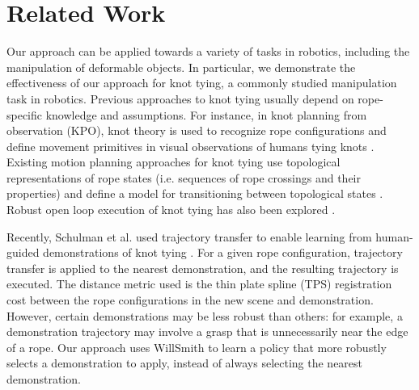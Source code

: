 \section{Related Work}

Our approach can be applied towards a variety of tasks in robotics,
including the manipulation of deformable objects.
In particular, we demonstrate the effectiveness of our approach for
knot tying, a commonly studied manipulation task in robotics.
Previous approaches to knot tying usually depend on rope-specific knowledge
and assumptions.
For instance, in knot planning from observation (KPO), knot theory is used
to recognize rope configurations and define movement primitives in visual
observations of humans tying knots \cite{Morita_ICRA2003, Takamatsu_TransRob2006}.
Existing motion planning approaches for knot tying use topological
representations of rope states (i.e. sequences of rope crossings and their
properties) and define a model for transitioning between topological states
\cite{Saha_ExpRobotics2008, Wakamatsu_IJRR2006}.
Robust open loop execution of knot tying has also been explored \cite{Bell_PhD2010}.

Recently, Schulman et al. used trajectory transfer to enable learning
from human-guided demonstrations of knot tying \cite{Schulmanetal_ISRR2013}.
For a given rope configuration, trajectory transfer is applied to the nearest
demonstration, and the resulting trajectory is executed.
The distance metric used is the thin plate spline (TPS) registration
cost between the rope configurations in the new scene and demonstration.
However, certain demonstrations may be less robust than others: for example,
a demonstration trajectory may involve a grasp that is unnecessarily near
the edge of a rope.
Our approach uses WillSmith to learn a policy that more robustly selects a
demonstration to apply, instead of always selecting the nearest demonstration.
